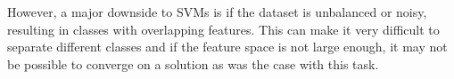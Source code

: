 However, a major downside to SVMs is if the dataset is unbalanced or noisy, resulting in classes with overlapping features. This can make it very difficult to separate different classes and if the feature space is not large enough, it may not be possible to converge on a solution as was the case with this task.\\

